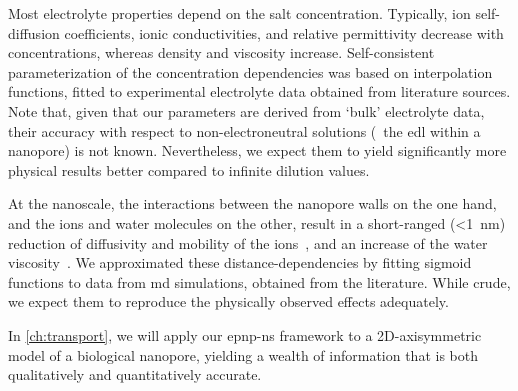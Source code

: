 Most electrolyte properties depend on the salt concentration. Typically, ion self-diffusion coefficients,
ionic conductivities, and relative permittivity decrease with concentrations, whereas density and viscosity
increase. Self-consistent parameterization of the concentration dependencies was based on interpolation
functions, fitted to experimental electrolyte data obtained from literature sources. Note that, given that our
parameters are derived from `bulk' electrolyte data, their accuracy with respect to non-electroneutral
solutions (\eg~the \gls{edl} within a nanopore) is not known. Nevertheless, we expect them to yield
significantly more physical results better compared to infinite dilution values. 

At the nanoscale, the interactions between the nanopore walls on the one hand, and the ions and water
molecules on the other, result in a short-ranged (\SI{<1}{\nm}) reduction of diffusivity and mobility of the
ions~\cite{Makarov-1998}, and an increase of the water viscosity~\cite{Pronk-2014}. We approximated these
distance-dependencies by fitting sigmoid functions to data from \gls{md} simulations, obtained from the
literature. While crude, we expect them to reproduce the physically observed effects adequately.

In \cref{ch:transport}, we will apply our \gls{epnp-ns} framework to a 2D-axisymmetric model of a biological
nanopore, yielding a wealth of information that is both qualitatively and quantitatively accurate. 


\cleardoublepage

